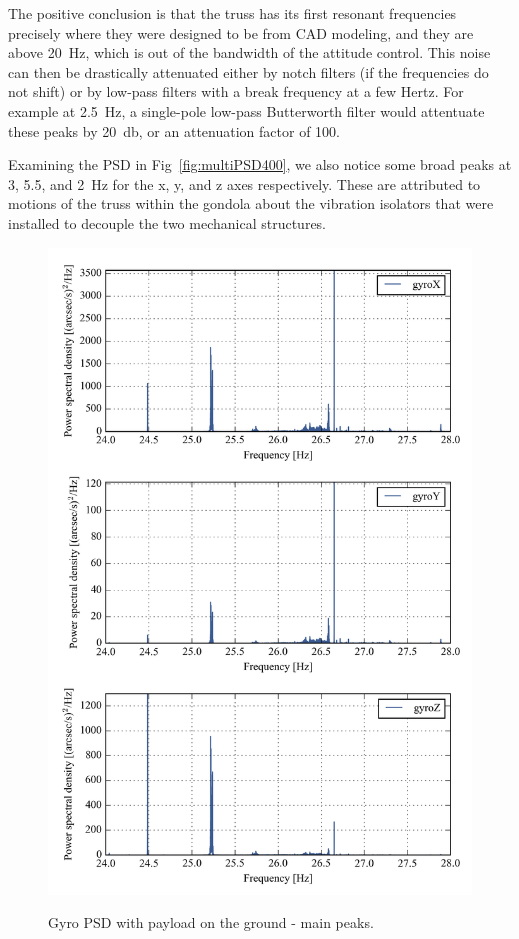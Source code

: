 The positive conclusion is that the truss has its first resonant frequencies precisely where they were designed to be from CAD modeling, and they are above \SI{20}{\hertz}, which is out of the bandwidth of the attitude control. This noise can then be drastically attenuated either by notch filters (if the frequencies do not shift) or by low-pass filters with a break frequency at a few Hertz. For example at \SI{2.5}{\hertz}, a single-pole low-pass Butterworth filter would attentuate these peaks by \SI{20}{\decibel}, or an attenuation factor of 100. 

Examining the PSD in Fig~\ref{fig:multiPSD400}, we also notice some broad peaks at 3, 5.5, and \SI{2}{\hertz} for the x, y, and z axes respectively. These are attributed to motions of the truss within the gondola about the vibration isolators that were installed to decouple the two mechanical structures. 

\begin{figure}[!h]
\begin{center}
\includegraphics{Figures/multiPSD_no_loglog_zoom_400.png}
\label{fig:multiPSD400_no_loglog_zoom_400}
\vspace{-0.5cm}
\caption[Gyro PSD with payload on the ground - Main peaks]{Gyro PSD with payload on the ground - main peaks.}
\end{center}
\end{figure}



